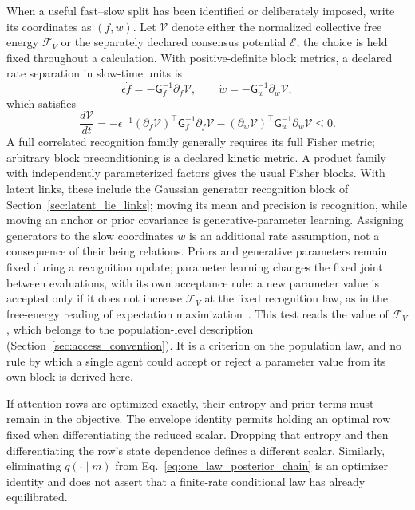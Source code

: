 When a useful fast--slow split has been identified or deliberately imposed, write its coordinates as $(f,w)$. Let $\mathcal V$ denote either the normalized collective free energy $\mathcal F_V$ or the separately declared consensus potential $\mathcal E$; the choice is held fixed throughout a calculation. With positive-definite block metrics, a declared rate separation in slow-time units is
\begin{equation}
\epsilon\dot f=-\mathsf G_f^{-1}\partial_f\mathcal V,
\qquad
\dot w=-\mathsf G_w^{-1}\partial_w\mathcal V,
\label{eq:declared_fast_slow_flow}
\end{equation}
which satisfies
\begin{equation}
\frac{d\mathcal V}{dt}
=-\epsilon^{-1}(\partial_f\mathcal V)^\top\mathsf G_f^{-1}\partial_f\mathcal V
-(\partial_w\mathcal V)^\top\mathsf G_w^{-1}\partial_w\mathcal V\leq0.
\end{equation}
A full correlated recognition family generally requires its full Fisher metric; arbitrary block preconditioning is a declared kinetic metric. A product family with independently parameterized factors gives the usual Fisher blocks. With latent links, these include the Gaussian generator recognition block of Section~\ref{sec:latent_lie_links}; moving its mean and precision is recognition, while moving an anchor or prior covariance is generative-parameter learning. Assigning generators to the slow coordinates $w$ is an additional rate assumption, not a consequence of their being relations. Priors and generative parameters remain fixed during a recognition update; parameter learning changes the fixed joint between evaluations, with its own acceptance rule: a new parameter value is accepted only if it does not increase $\mathcal F_V$ at the fixed recognition law, as in the free-energy reading of expectation maximization~\cite{Neal1998}. This test reads the value of $\mathcal F_V$, which belongs to the population-level description (Section~\ref{sec:access_convention}). It is a criterion on the population law, and no rule by which a single agent could accept or reject a parameter value from its own block is derived here.

If attention rows are optimized exactly, their entropy and prior terms must remain in the objective. The envelope identity permits holding an optimal row fixed when differentiating the reduced scalar. Dropping that entropy and then differentiating the row's state dependence defines a different scalar. Similarly, eliminating $q(\cdot\mid m)$ from Eq.~\eqref{eq:one_law_posterior_chain} is an optimizer identity and does not assert that a finite-rate conditional law has already equilibrated.

